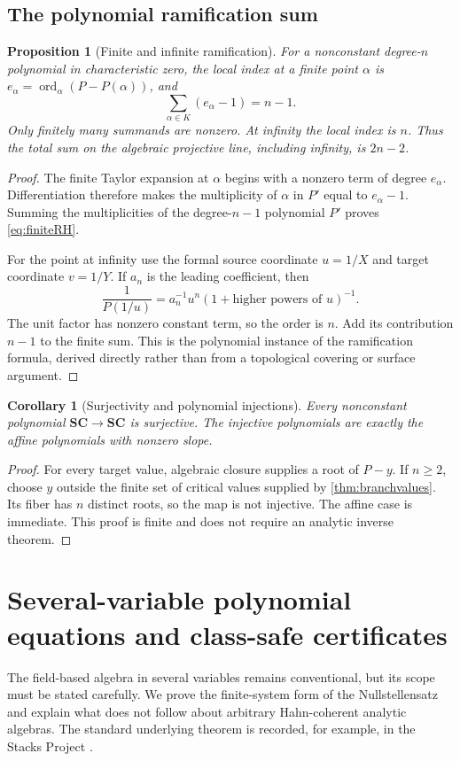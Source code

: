 \documentclass[11pt,letterpaper]{article}
\numberwithin{equation}{section}
\newtheorem{proposition}[proposition]{Proposition}
\newtheorem{corollary}[corollary]{Corollary}
\theoremstyle{definition}
\theoremstyle{remark}
\newcommand{\SC}{\mathbf{SC}}
\newcommand{\ord}{\operatorname{ord}}
\begin{document}
\subsection{The polynomial ramification sum}
\begin{proposition}[Finite and infinite ramification]\label{prop:ramification}
For a nonconstant degree-$n$ polynomial in characteristic zero, the local index at a
finite point $\alpha$ is $e_\alpha=\ord_\alpha(P-P(\alpha))$, and
\begin{equation}\label{eq:finiteRH}
 \sum_{\alpha\in K}(e_\alpha-1)=n-1.
\end{equation}
Only finitely many summands are nonzero. At infinity the local index is
$n$. Thus the total sum on the algebraic projective line, including
infinity, is $2n-2$.
\end{proposition}
\begin{proof}
The finite Taylor expansion at $\alpha$ begins with a nonzero term of
degree $e_\alpha$. Differentiation therefore makes the multiplicity of
$\alpha$ in $P'$ equal to $e_\alpha-1$. Summing the multiplicities of
the degree-$n-1$ polynomial $P'$ proves \eqref{eq:finiteRH}.

For the point at infinity use the formal source coordinate $u=1/X$ and
target coordinate $v=1/Y$. If $a_n$ is the leading coefficient, then
\[
 \frac1{P(1/u)}=a_n^{-1}u^n(1+\text{higher powers of }u)^{-1}.
\]
The unit factor has nonzero constant term, so the order is $n$. Add its
contribution $n-1$ to the finite sum. This is the polynomial instance of
the ramification formula, derived directly rather than from a
topological covering or surface argument.
\end{proof}

\begin{corollary}[Surjectivity and polynomial injections]\label{cor:polynomialmaps}
Every nonconstant polynomial $\SC\to\SC$ is surjective. The injective
polynomials are exactly the affine polynomials with nonzero slope.
\end{corollary}
\begin{proof}
For every target value, algebraic closure supplies a root of $P-y$.
If $n\ge2$, choose $y$ outside the finite set of critical values supplied
by \cref{thm:branchvalues}. Its fiber has $n$ distinct roots, so the map is
not injective. The affine case is immediate. This proof is finite and
does not require an analytic inverse theorem.
\end{proof}

\section{Several-variable polynomial equations and class-safe certificates}\label{sec:nullstellensatz}
The field-based algebra in several variables remains conventional, but
its scope must be stated carefully. We prove the finite-system form of
the Nullstellensatz and explain what does not follow about arbitrary
Hahn-coherent analytic algebras. The standard underlying theorem is
recorded, for example, in the Stacks Project \cite[Tag~00FV]{StacksNS}.
\end{document}
